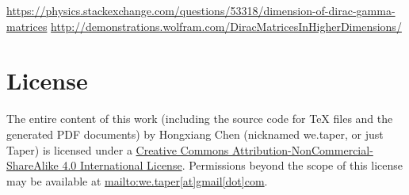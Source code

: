 \documentclass{article}
\begin{document}
\begin{thebibliography}{1}
    \url{https://physics.stackexchange.com/questions/53318/dimension-of-dirac-gamma-matrices}
    \url{http://demonstrations.wolfram.com/DiracMatricesInHigherDimensions/}
\end{thebibliography}
\printnomenclature
\section{License}
The entire content of this work (including the source code
for TeX files and the generated PDF documents) by 
Hongxiang Chen (nicknamed we.taper, or just Taper) is
licensed under a 
\href{http://creativecommons.org/licenses/by-nc-sa/4.0/}{Creative 
Commons Attribution-NonCommercial-ShareAlike 4.0 International 
License}. Permissions beyond the scope of this 
license may be available at \url{mailto:we.taper[at]gmail[dot]com}.
\end{document}
